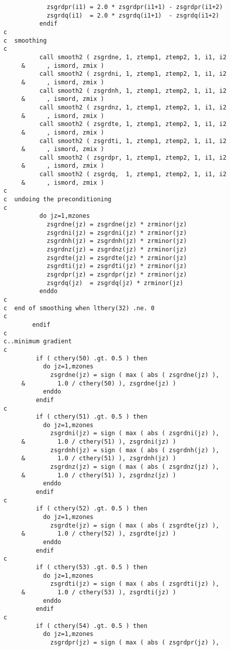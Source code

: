 \begin{verbatim}
            zsgrdpr(i1) = 2.0 * zsgrdpr(i1+1) - zsgrdpr(i1+2)
            zsgrdq(i1)  = 2.0 * zsgrdq(i1+1)  - zsgrdq(i1+2)
          endif
c
c  smoothing
c
          call smooth2 ( zsgrdne, 1, ztemp1, ztemp2, 1, i1, i2
     &      , ismord, zmix )
          call smooth2 ( zsgrdni, 1, ztemp1, ztemp2, 1, i1, i2
     &      , ismord, zmix )
          call smooth2 ( zsgrdnh, 1, ztemp1, ztemp2, 1, i1, i2
     &      , ismord, zmix )
          call smooth2 ( zsgrdnz, 1, ztemp1, ztemp2, 1, i1, i2
     &      , ismord, zmix )
          call smooth2 ( zsgrdte, 1, ztemp1, ztemp2, 1, i1, i2
     &      , ismord, zmix )
          call smooth2 ( zsgrdti, 1, ztemp1, ztemp2, 1, i1, i2
     &      , ismord, zmix )
          call smooth2 ( zsgrdpr, 1, ztemp1, ztemp2, 1, i1, i2
     &      , ismord, zmix )
          call smooth2 ( zsgrdq,  1, ztemp1, ztemp2, 1, i1, i2
     &      , ismord, zmix )
c
c  undoing the preconditioning
c
          do jz=1,mzones
            zsgrdne(jz) = zsgrdne(jz) * zrminor(jz)
            zsgrdni(jz) = zsgrdni(jz) * zrminor(jz)
            zsgrdnh(jz) = zsgrdnh(jz) * zrminor(jz)
            zsgrdnz(jz) = zsgrdnz(jz) * zrminor(jz)
            zsgrdte(jz) = zsgrdte(jz) * zrminor(jz)
            zsgrdti(jz) = zsgrdti(jz) * zrminor(jz)
            zsgrdpr(jz) = zsgrdpr(jz) * zrminor(jz)
            zsgrdq(jz)  = zsgrdq(jz) * zrminor(jz)
          enddo
c
c  end of smoothing when lthery(32) .ne. 0
c
        endif
c
c..minimum gradient
c
         if ( cthery(50) .gt. 0.5 ) then
           do jz=1,mzones
             zsgrdne(jz) = sign ( max ( abs ( zsgrdne(jz) ),
     &         1.0 / cthery(50) ), zsgrdne(jz) )
           enddo
         endif
c
         if ( cthery(51) .gt. 0.5 ) then
           do jz=1,mzones
             zsgrdni(jz) = sign ( max ( abs ( zsgrdni(jz) ),
     &         1.0 / cthery(51) ), zsgrdni(jz) )
             zsgrdnh(jz) = sign ( max ( abs ( zsgrdnh(jz) ),
     &         1.0 / cthery(51) ), zsgrdnh(jz) )
             zsgrdnz(jz) = sign ( max ( abs ( zsgrdnz(jz) ),
     &         1.0 / cthery(51) ), zsgrdnz(jz) )
           enddo
         endif
c
         if ( cthery(52) .gt. 0.5 ) then
           do jz=1,mzones
             zsgrdte(jz) = sign ( max ( abs ( zsgrdte(jz) ),
     &         1.0 / cthery(52) ), zsgrdte(jz) )
           enddo
         endif
c
         if ( cthery(53) .gt. 0.5 ) then
           do jz=1,mzones
             zsgrdti(jz) = sign ( max ( abs ( zsgrdti(jz) ),
     &         1.0 / cthery(53) ), zsgrdti(jz) )
           enddo
         endif
c
         if ( cthery(54) .gt. 0.5 ) then
           do jz=1,mzones
             zsgrdpr(jz) = sign ( max ( abs ( zsgrdpr(jz) ),

\end{verbatim}
